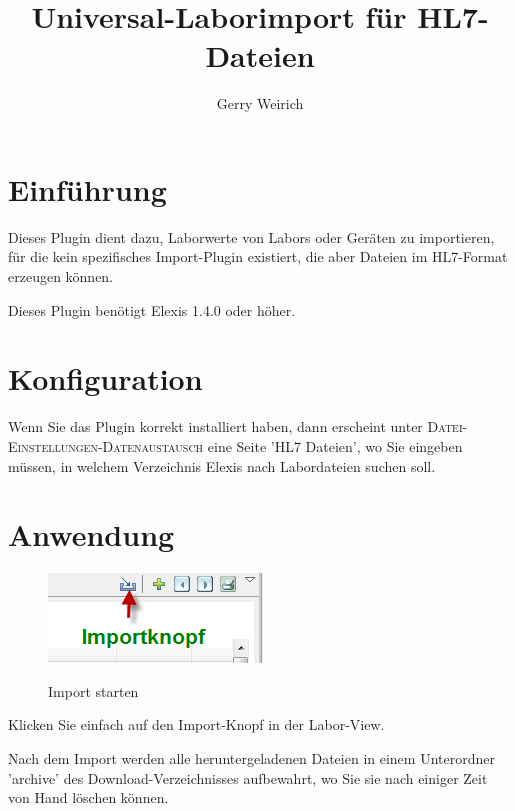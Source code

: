\documentclass[a4paper]{scrartcl}
\begin{document}
\title{Universal-Laborimport für HL7-Dateien}
\author{Gerry Weirich}
\maketitle
\section{Einführung}
Dieses Plugin dient dazu, Laborwerte von Labors oder Geräten zu importieren, für die kein spezifisches Import-Plugin existiert, die aber Dateien im HL7-Format erzeugen können.

\medskip

Dieses Plugin benötigt Elexis 1.4.0 oder höher.

\section{Konfiguration}

Wenn Sie das Plugin korrekt installiert haben, dann erscheint unter \textsc{Datei-Einstellungen-Datenaustausch} eine Seite 'HL7 Dateien', wo Sie eingeben müssen, in welchem Verzeichnis Elexis nach Labordateien suchen soll. 

\section{Anwendung}
\begin{figure}
  \includegraphics{abb1.png}\\
  \caption{Import starten}\label{fig:lab1}
\end{figure}


Klicken Sie einfach auf den Import-Knopf in der Labor-View. 

\medskip


Nach dem Import werden alle heruntergeladenen Dateien in einem Unterordner 'archive' des Download-Verzeichnisses aufbewahrt, wo Sie sie nach einiger Zeit von Hand löschen können.
\end{document}
